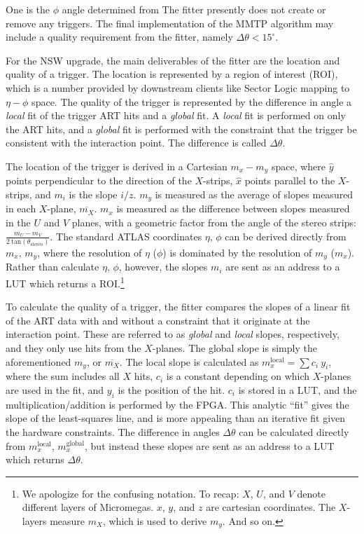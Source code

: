   




 One is the $\phi$ angle determined from 
 The fitter presently does not create or remove any triggers. The final implementation of the MMTP algorithm may include a quality requirement
 from the fitter, namely $\Delta\theta < 15^\circ$.

For the NSW upgrade, the main deliverables of the fitter are the location and quality of a trigger. 
The location is represented by a region of interest (ROI), which is a number provided by downstream clients like
 Sector Logic mapping to $\eta-\phi$ space. The quality of the trigger is represented by the difference in angle
 a \textit{local} fit of the trigger ART hits and a \textit{global} fit. A \textit{local} fit is performed
 on only the ART hits, and a \textit{global} fit is performed with the constraint that the trigger be consistent
 with the interaction point. The difference is called $\Delta\theta$.

The location of the trigger is derived in a Cartesian $m_x-m_y$ space, where $\hat{y}$ points perpendicular to the direction
 of the $X$-strips, $\hat{x}$ points parallel to the $X$-strips, and $m_i$ is the slope $i/z$. $m_y$ is measured as 
the average of slopes measured in each $X$-plane, $\overline{m_X}$. $m_x$ is measured as the difference
 between slopes measured in the $U$ and $V$ planes, with a geometric factor from the angle of the
 stereo strips: $\frac{m_U - m_V}{2\ \text{tan}(\theta_\text{stereo})}$. The standard ATLAS coordinates
 $\eta$, $\phi$ can be derived directly from $m_x$, $m_y$, where the resolution of $\eta$ ($\phi$) is dominated by
 the resolution of $m_y$ ($m_x$). Rather than calculate $\eta$, $\phi$, however, the slopes $m_i$ are sent as an address
 to a LUT which returns a ROI.\footnote{We apologize for the confusing notation. 
To recap: $X$, $U$, and $V$ denote different layers of Micromegas. $x$, $y$, and $z$ are cartesian coordinates. 
The $X$-layers measure $m_X$, which is used to derive $m_y$. And so on.}

To calculate the quality of a trigger, the fitter compares the slopes of a linear fit of the ART data with and without a
 constraint that it originate at the interaction point. These are referred to as \textit{global} and \textit{local} slopes, 
respectively, and they only use hits from the $X$-planes. The global slope is simply the aforementioned $m_y$, or $\overline{m_X}$. 
The local slope is calculated as $m_x^\text{local} = \sum c_i \ y_i$, where the sum includes all $X$ hits, $c_i$ is a constant depending
 on which $X$-planes are used in the fit, and $y_i$ is the position of the hit. $c_i$ is stored in a LUT,
 and the multiplication/addition is performed by the FPGA. This analytic ``fit'' gives the slope of
 the least-squares line, and is more appealing than an iterative fit given the hardware constraints.
 The difference in angles $\Delta\theta$ can be calculated directly from $m_x^\text{local}$, $m_x^\text{global}$, but instead these
 slopes are sent as an address to a LUT which returns $\Delta\theta$.

